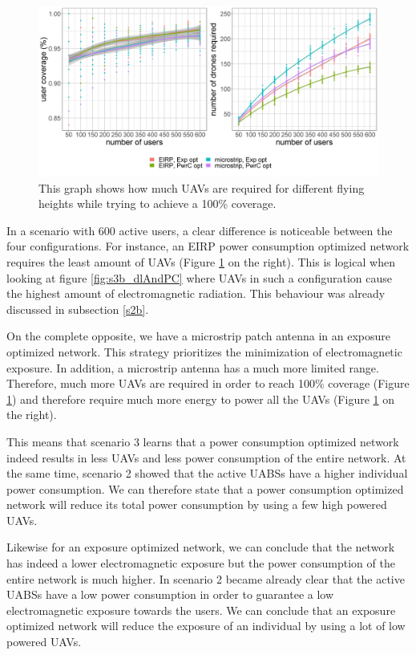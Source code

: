 \begin{figure}[h!]
  \includegraphics[width=\textwidth]{../results/s3/uvsnumdronesAndCov.png}
  \caption{This graph shows how much \gls{UAV}s are required for different flying heights while trying to achieve a 100\% coverage.}
  \label{fig:s3b_numdronesAndCov}
\end{figure}

In a scenario with 600 active users, a clear difference is noticeable between the four configurations. 
For instance, an EIRP power consumption optimized 
network requires the least amount of \gls{UAV}s (Figure \ref{fig:s3b_numdronesAndCov} on the right). This is logical when looking at figure \ref{fig:s3b_dlAndPC} where \gls{UAV}s in such a configuration cause 
the highest amount of 
electromagnetic radiation. This behaviour was already discussed in subsection \ref{s2b}. 

On the complete opposite, we have a microstrip patch antenna in an exposure optimized network. 
This strategy prioritizes the minimization of electromagnetic exposure. In addition, a microstrip antenna has a much more limited range.
Therefore, much more 
\gls{UAV}s are required in order to reach 100\% coverage (Figure \ref{fig:s3b_numdronesAndCov}) and therefore require much more energy 
to power all the \gls{UAV}s (Figure \ref{fig:s3b_numdronesAndCov} on the right).

This means that scenario 3 learns that a power consumption optimized network indeed results in less \gls{UAV}s and less 
 power consumption of the entire network. 
At the same time, scenario 2 showed that the active \gls{UABS}s have a higher individual power consumption.
We can therefore state that a power consumption optimized network will reduce its total power consumption by
using a few high powered \gls{UAV}s.

Likewise for an exposure optimized network, we can conclude that the network has indeed a lower electromagnetic exposure but the power consumption 
of the entire network is much higher. In scenario 2 became already clear that the active \gls{UABS}s have a low power consumption in order to 
guarantee a low electromagnetic exposure towards the users.
We can conclude that an exposure optimized network will reduce the exposure of an individual by 
using a lot of low powered \gls{UAV}s.

